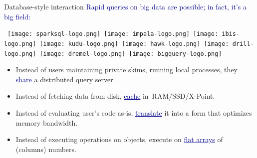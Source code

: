 \documentclass{beamer}
\begin{document}
\begin{frame}{Database-style interaction}
\vspace{0.5 cm}
\textcolor{darkblue}{Rapid queries on big data are possible; in fact, it's a big field:}

\vspace{0.5 cm}
\mbox{\hspace{-1 cm}
\texttt{[image: sparksql-logo.png]}
\texttt{[image: impala-logo.png]}
\texttt{[image: ibis-logo.png]}
\texttt{[image: kudu-logo.png]}
\texttt{[image: hawk-logo.png]}
\texttt{[image: drill-logo.png]}
\texttt{[image: dremel-logo.png]}
\texttt{[image: bigquery-logo.png]}}

\vspace{0.5 cm}
\begin{itemize}\setlength{\itemsep}{0.25 cm}
\item<2-> Instead of users maintaining private skims, running local processes, they \textcolor{darkblue}{\underline{share}} a distributed query server.
\item<3-> Instead of fetching data from disk, \textcolor{darkblue}{\underline{cache}} \mbox{in RAM/SSD/X-Point.\hspace{-1 cm}}
\item<4-> Instead of evaluating user's code as-is, \textcolor{darkblue}{\underline{translate}} it into a form that optimizes memory bandwidth.
\item<5-> Instead of executing operations on objects, execute on \textcolor{darkblue}{\underline{flat arrays}} of (columns) numbers.
\end{itemize}
\end{frame}
\end{document}
